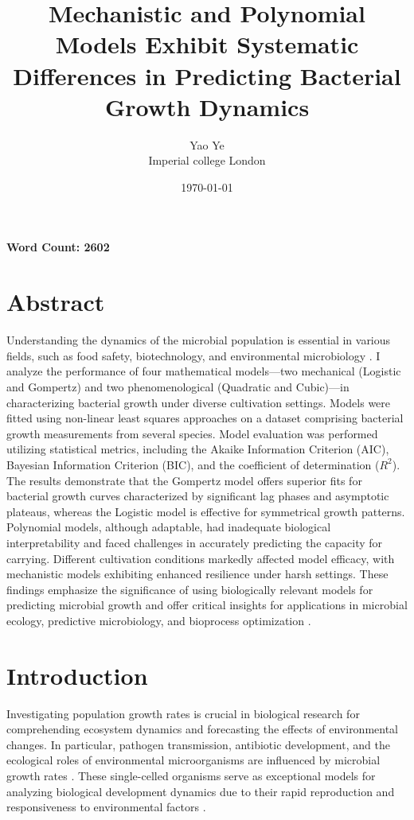\documentclass[11pt]{article}
\begin{document}
\title{Mechanistic and Polynomial Models Exhibit Systematic Differences in Predicting Bacterial Growth Dynamics}
\author{Yao Ye \\
Imperial college London}
\date{\today}
\maketitle

\begin{center}
\textbf{Word Count: 2602}
\end{center}

\newpage
\section*{Abstract}
\thispagestyle{empty} %
Understanding the dynamics of the microbial population is essential in various fields, such as food safety, biotechnology, and environmental microbiology \citep{Huang2013}. I analyze the performance of four mathematical models—two mechanical (Logistic and Gompertz) and two phenomenological (Quadratic and Cubic)—in characterizing bacterial growth under diverse cultivation settings. Models were fitted using non-linear least squares approaches on a dataset comprising bacterial growth measurements from several species. Model evaluation was performed utilizing statistical metrics, including the Akaike Information Criterion (AIC), Bayesian Information Criterion (BIC), and the coefficient of determination ($R^2$). The results demonstrate that the Gompertz model offers superior fits for bacterial growth curves characterized by significant lag phases and asymptotic plateaus, whereas the Logistic model is effective for symmetrical growth patterns. Polynomial models, although adaptable, had inadequate biological interpretability and faced challenges in accurately predicting the capacity for carrying. Different cultivation conditions markedly affected model efficacy, with mechanistic models exhibiting enhanced resilience under harsh settings. These findings emphasize the significance of using biologically relevant models for predicting microbial growth and offer critical insights for applications in microbial ecology, predictive microbiology, and bioprocess optimization \citep{Huber2017}.

\newpage
\section{Introduction}
Investigating population growth rates is crucial in biological research for comprehending ecosystem dynamics and forecasting the effects of environmental changes. In particular, pathogen transmission, antibiotic development, and the ecological roles of environmental microorganisms are influenced by microbial growth rates \citep{Peleg2011}. These single-celled organisms serve as exceptional models for analyzing biological development dynamics due to their rapid reproduction and responsiveness to environmental factors \citep{Pla2015}.
\end{document}
